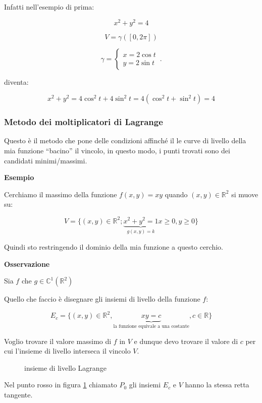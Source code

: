 \documentclass[../appunti-analisi.tex]{subfiles}
\begin{document}
Infatti nell'esempio di prima:

\[
    x^{2}+y^{2} = 4
\]

\[
    V = \gamma([0,2\pi])
\]

\[
    \gamma =
        \begin{cases}
            x=2 \cos t\\
               y= 2 \sin t
        \end{cases}\,.
\]

diventa:

\[
    x^{2}+y^{2} = 4 \cos ^{2} t + 4 \sin ^{2} t = 4 ( \cos ^{2} t + \sin ^{2} t) =4
\]

\subsubsection{Metodo dei moltiplicatori di Lagrange}

Questo è il metodo che pone delle condizioni affinché il le curve di livello della mia funzione ``bacino'' il vincolo, in questo modo, i punti trovati sono dei candidati minimi/massimi.

\textbf{Esempio} 

Cerchiamo il massimo della funzione $f(x,y) = xy$ quando $(x,y) \in \mathbb{R}^{2}$ si muove su:

\[
    V= \{(x,y) \in \mathbb{R}^{2};\underbrace{ x^{2}+y^{2}=1}_\text{$g(x,y) = k$} x \ge 0, y \ge 0\}
\]

Quindi sto restringendo il dominio della mia funzione a questo cerchio.

\textbf{Osservazione} 

Sia $f$ che $g \in \mathbb{C}^{1}(\mathbb{R}^{2})$

Quello che faccio è disegnare gli insiemi di livello della funzione $f$:

\[
    E_c = \{(x,y) \in \mathbb{R}^{2}, \underbrace{xy = c}_\text{la funzione equivale a una costante}, c \in \mathbb{R}\}
\]

Voglio trovare il valore massimo di $f$ in $V$ e dunque devo trovare il valore di $c$ per cui l'insieme di livello interseca il vincolo $V$.


\begin{figure}[ht]
    \caption{insieme di livello Lagrange}
    \label{fig:insieme-di-livello-lagrange}
\end{figure}

Nel punto rosso in figura \ref{fig:insieme-di-livello-lagrange} chiamato $P_0$ gli insiemi $E_c$ e $V$ hanno la stessa retta tangente.
\end{document}
